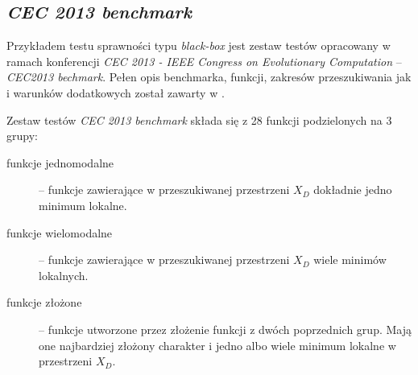 \documentclass[12pt,a4paper]{report}
\begin{document}
{{{{\subsection{\emph{CEC 2013 benchmark}}
\label{CEC2013chapter}
\par{
Przykładem testu sprawności typu \emph{black-box} jest zestaw testów opracowany w ramach konferencji \emph{CEC 2013 - IEEE Congress on Evolutionary Computation} -- \emph{CEC2013 bechmark}. Pełen opis benchmarka, funkcji, zakresów przeszukiwania jak i warunków dodatkowych został zawarty w \cite{Li13benchmarkfunctions}.
}
\par{
Zestaw testów \emph{CEC 2013 benchmark} składa się z 28 funkcji podzielonych na 3 grupy:
\begin{description}
\item[funkcje jednomodalne] -- funkcje zawierające w przeszukiwanej przestrzeni $X_D$ dokładnie jedno minimum lokalne.
\item[funkcje wielomodalne] -- funkcje zawierające w przeszukiwanej przestrzeni $X_D$ wiele minimów lokalnych.
\item[funkcje złożone] -- funkcje utworzone przez złożenie funkcji z dwóch poprzednich grup. Mają one najbardziej złożony charakter i jedno albo wiele minimum lokalne w przestrzeni $X_D$.
\end{description}

}}}}}
\end{document}
